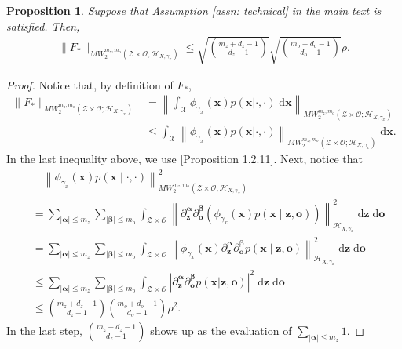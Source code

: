 \documentclass[11pt]{article}
\newcommand{\bx}{\mathbf x}
\newcommand{\bz}{\mathbf z}
\newcommand{\bo}{\mathbf o}
\newcommand{\calZ}{\mathcal{Z}}
\newcommand{\calH}{\mathcal{H}}
\newcommand{\calO}{\mathcal{O}}
\newcommand{\calX}{\mathcal{X}}
\newcommand{\0}{\mathbf{0}}
\newcommand{\balpha}{\boldsymbol\alpha}
\newcommand{\bbeta}{\boldsymbol\beta}
\newtheorem{prop}{Proposition}[section]
\begin{document}
\begin{appendix}
\begin{prop}\label{prop:F_ast_sobolev}
Suppose that Assumption \ref{assn: technical} in the main text is satisfied. Then,
\begin{align*}
    \|F_{\ast}\|_{MW^{m_z, m_o}_2(\calZ\times\calO;\calH_{X,\gamma_x})} \leq \sqrt{\binom{m_z + d_z -1}{d_z -1}} \sqrt{ \binom{m_o + d_o-1}{d_o -1}} \rho.
\end{align*}
\end{prop}
\begin{proof}
Notice that, by definition of $F_{\ast}$, 
\begin{align*}
    \|F_{\ast}\|_{MW^{m_z, m_o}_2(\calZ\times\calO;\calH_{X,\gamma_x})} &= \left\|\int_{\calX} \phi_{\gamma_x}(\bx)p(\bx|\cdot, \cdot)\;\mathrm{d} \bx \right\|_{MW^{m_z, m_o}_2(\calZ\times\calO;\calH_{X,\gamma_x})} \\
    &\leq \int_{\calX} \left\|\phi_{\gamma_x}(\bx)p(\bx|\cdot,\cdot )\right\|_{MW^{m_z, m_o}_2(\calZ\times\calO;\calH_{X,\gamma_x})}\;\mathrm{d} \bx .
\end{align*}
In the last inequality above, we use \cite{Hytönen2016AnalysisBanachSpaces}[Proposition 1.2.11].
Next, notice that
\begin{align*}
    &\quad \left\|\phi_{\gamma_x}(\bx) p(\bx \mid \cdot,\cdot)\right\|_{MW^{m_z, m_o}_2(\calZ\times\calO;\calH_{X,\gamma_x})}^2 \\
    &= \sum_{|\balpha|\leq m_z} \sum_{|\bbeta|\leq m_o} \int_{\calZ\times\calO} \left\|\partial^{\balpha}_\bz \partial^{\bbeta}_\bo \left(\phi_{\gamma_x}(\bx) p(\bx\mid \bz, \bo) \right) \right\|_{\calH_{X,\gamma_x}}^2 \;\mathrm{d} \bz \;\mathrm{d} \bo \\
    &= \sum_{|\balpha|\leq m_z} \sum_{|\bbeta|\leq m_o} \int_{\calZ\times\calO} \left\|\phi_{\gamma_x}(\bx) \partial^{\balpha}_\bz \partial^{\bbeta}_\bo p(\bx \mid \bz, \bo) \right\|_{\calH_{X,\gamma_x}}^2 \;\mathrm{d} \bz \;\mathrm{d} \bo \\
    &\leq \sum_{|\balpha|\leq m_z} \sum_{|\bbeta|\leq m_o} \int_{\calZ\times \calO} \left|\partial^{\balpha}_\bz \partial^{\bbeta}_\bo p(\bx| \bz, \bo) \right|^2 \;\mathrm{d} \bz \;\mathrm{d} \bo \\ 
    &\leq \binom{m_z + d_z -1}{d_z -1} \binom{m_o + d_o-1}{d_o -1} \rho^2  .
\end{align*}
In the last step, $\binom{m_z + d_z -1}{d_z -1}$ shows up as the evaluation of $\sum_{|\balpha| \leq m_z} 1$.
\end{proof}


\end{appendix}
\end{document}
